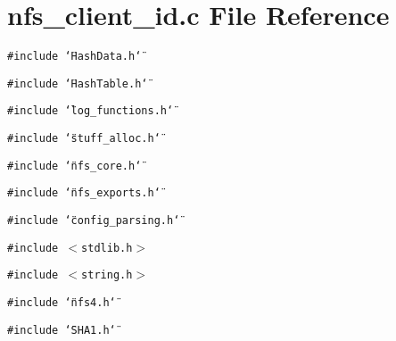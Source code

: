 \section{nfs\_\-client\_\-id.c File Reference}
\label{nfs__client__id_8c}
{\tt \#include \char`\"{}Hash\-Data.h\char`\"{}}\par
{\tt \#include \char`\"{}Hash\-Table.h\char`\"{}}\par
{\tt \#include \char`\"{}log\_\-functions.h\char`\"{}}\par
{\tt \#include \char`\"{}stuff\_\-alloc.h\char`\"{}}\par
{\tt \#include \char`\"{}nfs\_\-core.h\char`\"{}}\par
{\tt \#include \char`\"{}nfs\_\-exports.h\char`\"{}}\par
{\tt \#include \char`\"{}config\_\-parsing.h\char`\"{}}\par
{\tt \#include $<$stdlib.h$>$}\par
{\tt \#include $<$string.h$>$}\par
{\tt \#include \char`\"{}nfs4.h\char`\"{}}\par
{\tt \#include \char`\"{}SHA1.h\char`\"{}}\par
